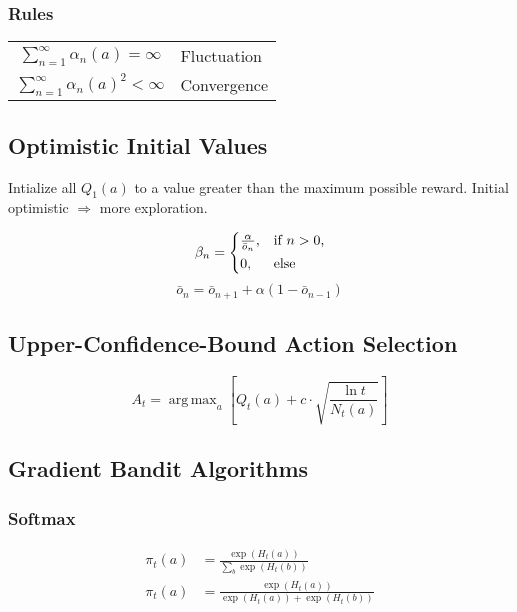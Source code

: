 \documentclass[10pt, landscape, a4paper]{article}
\DeclareMathOperator*{\argmax}{arg\,max}
\begin{document}
\begin{multicols}{3}
        \subsubsection{Rules}
        \begin{tabular}{ c l }
            $\sum_{n=1}^\infty \alpha_n(a) = \infty$   & Fluctuation \\
            $\sum_{n=1}^\infty \alpha_n(a)^2 < \infty$ & Convergence \\
        \end{tabular}

        \subsection{Optimistic Initial Values}
        Intialize all $Q_1(a)$ to a value greater than the maximum possible reward.
        Initial optimistic $\Rightarrow$ more exploration.

        \begin{equation}
            \beta_n =
            \begin{cases*}
                \frac{\alpha}{\bar{o}_n}, & if $ n > 0 $,\\
                0, & else
            \end{cases*}
        \end{equation}
        \begin{equation}
            \bar{o}_n=\bar{o}_{n+1}+\alpha(1-\bar{o}_{n-1})
        \end{equation}

        \subsection{Upper-Confidence-Bound Action Selection}
        \begin{equation}
            A_t = \argmax_{a} \left[ Q_t(a) + c \cdot \sqrt{\frac{\ln t}{N_t(a)}} \right]
        \end{equation}

        \subsection{Gradient Bandit Algorithms}

        \subsubsection{Softmax}
        \begin{equation}
            \begin{split}
                \pi_t(a) &= \frac{\exp \left( H_t(a) \right)}{\sum_{b} \exp \left( H_t(b) \right)} \\
                \pi_t(a) &= \frac{\exp \left( H_t(a) \right)}{\exp \left( H_t(a) \right) + \exp \left( H_t(b) \right)} \\
            \end{split}
        \end{equation}


\end{multicols}
\end{document}
